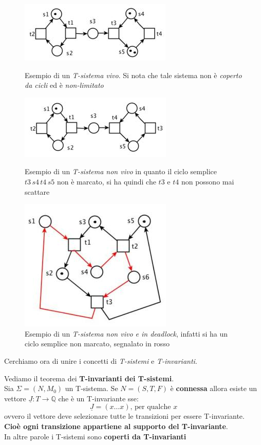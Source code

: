 \documentclass[a4paper,12pt, oneside]{book}
\begin{document}
\begin{figure}[H]
  \centering
  \includegraphics[scale = 0.6]{img/tsi3.jpg}
  \caption{Esempio di un \emph{T-sistema vivo}. Si nota che tale sistema non è
    \emph{coperto da cicli} ed è \emph{non-limitato}}
  \includegraphics[scale = 0.6]{img/tsi4.jpg}
  \caption{Esempio di un \emph{T-sistema non vivo} in quanto il ciclo semplice
    $t3\,s4\,t4\,s5$ non è marcato, si ha quindi che $t3$ e $t4$ non
    possono mai scattare}
  \includegraphics[scale = 0.5]{img/tsi5.jpg}
  \caption{Esempio di un \emph{T-sistema non vivo e in deadlock}, infatti si ha
    un ciclo semplice non marcato, segnalato in rosso}
\end{figure}
\newpage
Cerchiamo ora di unire i concetti di \textit{T-sistemi} e \textit{T-invarianti}.
\begin{teorema}
  Vediamo il teorema dei \textbf{T-invarianti dei T-sistemi}.\\
  Sia $\Sigma =(N,M_0)$ un T-sistema. Se $N=(S,T,F)$ è \textbf{connessa} allora
  esiste un vettore $\underline{J}:T\to \mathbb{Q}$ che è un T-invariante sse:
  \[\underline{J}=(x\ldots x)\mbox{, per qualche }x\]
  ovvero il vettore deve selezionare tutte le transizioni per essere
  T-invariante.\\
  \textbf{Cioè ogni transizione appartiene al supporto del T-invariante}.\\
  In altre parole i T-sistemi sono \textbf{coperti da T-invarianti} 
\end{teorema}
\end{document}
